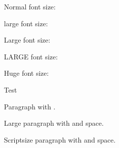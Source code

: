 \documentclass{scrartcl}
\begin{document}
Normal font size: \quaver

\large
large font size: \quaver

\Large
Large font size: \quaver

\LARGE
LARGE  font size: \quaver

\Huge
Huge font size: \quaver

Test

\bigskip

Paragraph with \quaver*.

\Large
Large paragraph with \quaver and space.

\scriptsize
Scriptsize paragraph with \quaver and space.

\end{document}
